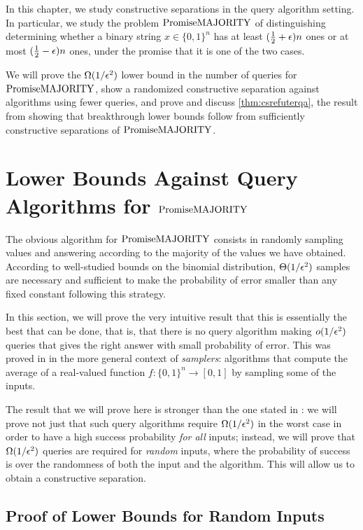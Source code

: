 In this chapter, we study constructive separations in the query algorithm setting.
In particular, we study the problem $\mathrm{PromiseMAJORITY}$ of distinguishing determining whether
a binary string $x \in \{0, 1\}^n$ has at least $(\frac{1}{2}+\epsilon)n$ ones or
at most $(\frac{1}{2}-\epsilon)n$ ones, under the promise that it is one of the two
cases. 

We will prove the $\Omega(1/\epsilon^2)$ lower bound in the number of queries
for $\mathrm{PromiseMAJORITY}$, show a randomized constructive separation against algorithms
using fewer queries, and prove and discuss \cref{thm:csrefuterqa}, the result
from \cite{ConstructiveSeparations} showing that breakthrough lower
bounds follow from sufficiently constructive separations of $\mathrm{PromiseMAJORITY}$.  


\section{Lower Bounds Against Query Algorithms for $\mathrm{PromiseMAJORITY}$}

The obvious algorithm for $\mathrm{PromiseMAJORITY}$ consists in randomly sampling values and answering 
according to the majority of the values we have obtained. According to well-studied
bounds on the binomial distribution, $\Theta(1/\epsilon^2)$ samples
are necessary and sufficient to make the probability of error smaller than any 
fixed constant following this strategy.

In this section, we will prove the very intuitive result that this is essentially
the best that can be done, that is, that there is no query algorithm making $o(1/\epsilon^2)$
queries that gives the right answer with small probability of error. This was 
proved in \cite{Canetti95} in the more general context of \emph{samplers}: algorithms
that compute the average of a real-valued function $f \colon \{0, 1\}^n \to [0, 1]$
by sampling some of the inputs. 

The result that we will prove here is stronger than the one stated in \cite{Canetti95}:
we will prove not just that such query algorithms require $\Omega(1/\epsilon^2)$ in the 
worst case in order to have a high success probability \emph{for all} inputs; instead,
we will prove that $\Omega(1/\epsilon^2)$ queries are required for \emph{random} inputs,
where the probability of success is over the randomness of both the input and the algorithm.
This will allow us to obtain a constructive separation.

\subsection{Proof of Lower Bounds for Random Inputs}

